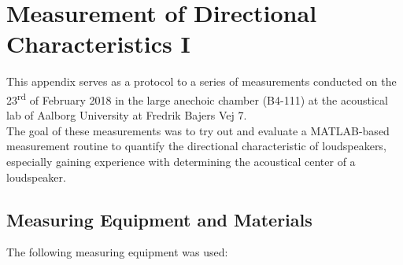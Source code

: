 \chapter{Measurement of Directional Characteristics I}\label{ax:directional_1}
This appendix serves as a protocol to a series of measurements conducted on the 23\textsuperscript{rd} of February 2018 in the large anechoic chamber (B4-111) at the acoustical lab of Aalborg University at Fredrik Bajers Vej 7.\\
The goal of these measurements was to try out and evaluate a MATLAB-based measurement routine to quantify the directional characteristic of loudspeakers, especially gaining experience with determining the acoustical center of a loudspeaker.

\section*{Measuring Equipment and Materials}
The following measuring equipment was used:
